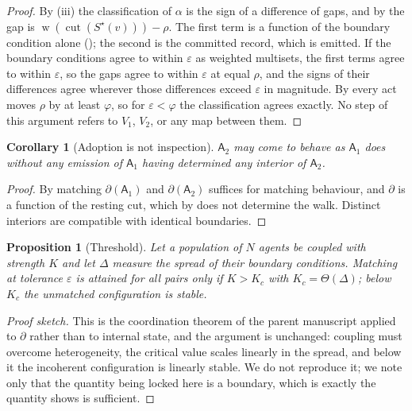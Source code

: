 \documentclass[11pt,a4paper]{article}
\theoremstyle{clstyle}
\newtheorem{proposition}[theorem]{Proposition}
\newtheorem{corollary}[theorem]{Corollary}
\theoremstyle{definition}
\theoremstyle{remark}
\DeclareMathOperator{\wt}{w}
\DeclareMathOperator{\cut}{cut}
\newcommand{\Ag}{\mathsf{A}}
\newcommand{\Kc}{K_{c}}
\newcommand{\term}{v}                    %
\begin{document}
\begin{proof}
By (iii) the classification of $\alpha$ is the sign
of a difference of gaps, and by  the gap is
$\wt(\cut(S^{\star}(\term)))-\rho$. The first term is a function of the
boundary condition alone (); the second is the committed
record, which is emitted. If the boundary conditions agree to within
$\varepsilon$ as weighted multisets, the first terms agree to within
$\varepsilon$, so the gaps agree to within $\varepsilon$ at equal $\rho$,
and the signs of their differences agree wherever those differences exceed
$\varepsilon$ in magnitude. By  every act moves $\rho$ by
at least $\varphi$, so for $\varepsilon<\varphi$ the classification agrees
exactly. No step of this argument refers to $V_1$, $V_2$, or any map between
them.
\end{proof}

\begin{corollary}[Adoption is not inspection]
\label{cor:adoptionnotinspection}
$\Ag_2$ may come to behave as $\Ag_1$ does without any emission of $\Ag_1$
having determined any interior of $\Ag_2$.
\end{corollary}

\begin{proof}
By  matching $\partial(\Ag_1)$ and $\partial(\Ag_2)$
suffices for matching behaviour, and $\partial$ is a function of the resting
cut, which by  does not determine the walk. Distinct
interiors are compatible with identical boundaries.
\end{proof}

\begin{proposition}[Threshold]
\label{prop:threshold}
Let a population of $N$ agents be coupled with strength $K$ and let
$\Delta$ measure the spread of their boundary conditions. Matching at
tolerance $\varepsilon$ is attained for all pairs only if $K>\Kc$ with
$\Kc=\Theta(\Delta)$; below $\Kc$ the unmatched configuration is stable.
\end{proposition}

\begin{proof}[Proof sketch]
This is the coordination theorem of the parent manuscript applied to
$\partial$ rather than to internal state, and the argument is unchanged:
coupling must overcome heterogeneity, the critical value scales linearly in
the spread, and below it the incoherent configuration is linearly stable. We
do not reproduce it; we note only that the quantity being locked here is a
boundary, which is exactly the quantity  shows is
sufficient.
\end{proof}
\end{document}
